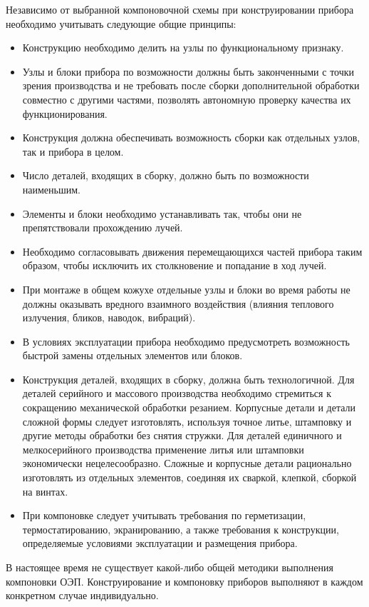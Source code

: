 Независимо от выбранной компоновочной схемы при конструировании прибора необходимо учитывать следующие общие принципы:
\begin{itemize}
	\item Конструкцию необходимо делить на узлы по функциональному признаку.
	\item Узлы и блоки прибора по возможности должны быть законченными с точки зрения производства и не требовать после сборки дополнительной обработки совместно с другими частями, позволять автономную проверку качества их функционирования.
	\item Конструкция должна обеспечивать возможность сборки как отдельных узлов, так и прибора в целом.
	\item Число деталей, входящих в сборку, должно быть по возможности наименьшим.
	\item Элементы и блоки необходимо устанавливать так, чтобы они не препятствовали прохождению лучей.
	\item Необходимо согласовывать движения перемещающихся частей прибора таким образом, чтобы исключить их столкновение и попадание в ход лучей.
	\item При монтаже в общем кожухе отдельные узлы и блоки во время работы не должны оказывать вредного взаимного воздействия (влияния теплового излучения, бликов, наводок, вибраций).
	\item В условиях эксплуатации прибора необходимо предусмотреть возможность быстрой замены отдельных элементов или блоков.
	\item Конструкция деталей, входящих в сборку, должна быть технологичной. Для деталей серийного и массового производства необходимо стремиться к сокращению механической обработки резанием. Корпусные детали и детали сложной формы следует изготовлять, используя точное литье, штамповку и другие методы обработки без снятия стружки. Для деталей единичного и мелкосерийного производства применение литья или штамповки экономически нецелесообразно. Сложные и корпусные детали рационально изготовлять из отдельных элементов, соединяя их сваркой, клепкой, сборкой на винтах.
	\item При компоновке следует учитывать требования по герметизации, термостатированию, экранированию, а также требования к конструкции, определяемые условиями эксплуатации и размещения прибора.
\end{itemize}

В настоящее время не существует какой-либо общей методики выполнения компоновки ОЭП. Конструирование и компоновку приборов выполняют в каждом конкретном случае индивидуально.

